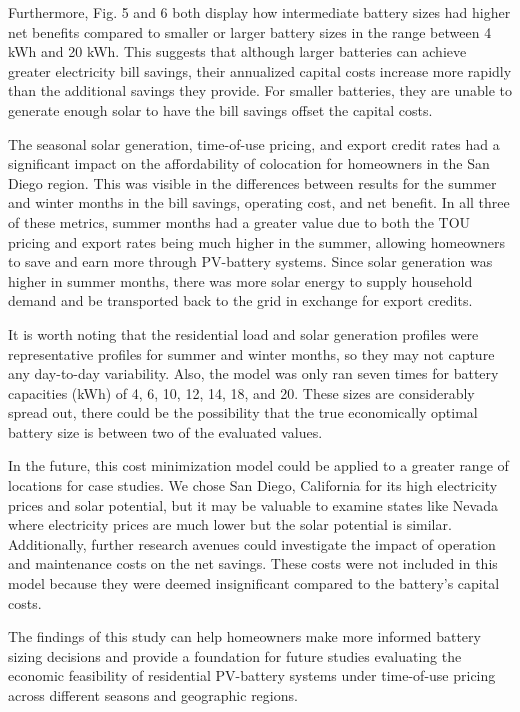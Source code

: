 \documentclass[14pt, final,numbered]{ifacconf}
\begin{document}
Furthermore, Fig. 5 and 6 both display how intermediate battery sizes had higher net benefits compared to smaller or larger battery sizes in the range between 4 kWh and 20 kWh. This suggests that although larger batteries can achieve greater electricity bill savings, their annualized capital costs increase more rapidly than the additional savings they provide. For smaller batteries, they are unable to generate enough solar to have the bill savings offset the capital costs. 

The seasonal solar generation, time-of-use pricing, and export credit rates had a significant impact on the affordability of colocation for homeowners in the San Diego region. This was visible in the differences between results for the summer and winter months in the bill savings, operating cost, and net benefit. In all three of these metrics, summer months had a greater value due to both the TOU pricing and export rates being much higher in the summer, allowing homeowners to save and earn more through PV-battery systems. Since solar generation was higher in summer months, there was more solar energy to supply household demand and be transported back to the grid in exchange for export credits. 

It is worth noting that the residential load and solar generation profiles were representative profiles for summer and winter months, so they may not capture any day-to-day variability. Also, the model was only ran seven times for battery capacities (kWh) of 4, 6, 10, 12, 14, 18, and 20. These sizes are considerably spread out, there could be the possibility that the true economically optimal battery size is between two of the evaluated values. 

In the future, this cost minimization model could be applied to a greater range of locations for case studies. We chose San Diego, California for its high electricity prices and solar potential, but it may be valuable to examine states like Nevada where electricity prices are much lower but the solar potential is similar. Additionally, further research avenues could investigate the impact of operation and maintenance costs on the net savings. These costs were not included in this model because they were deemed insignificant compared to the battery's capital costs. 

The findings of this study can help homeowners make more informed battery sizing decisions and provide a foundation for future studies evaluating the economic feasibility of residential PV-battery systems under time-of-use pricing across different seasons and geographic regions.


\end{document}
